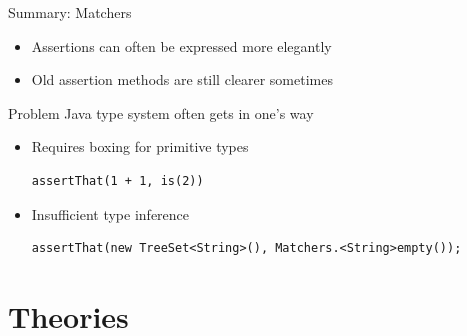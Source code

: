 \begin{frame}[fragile]{Summary: Matchers}
	\begin{itemize}
		\item Assertions can often be expressed more elegantly
		\item Old assertion methods are still clearer sometimes
	\end{itemize}
	\begin{block}{Problem}
		Java type system often gets in one's way
		\begin{itemize}
			\item Requires boxing for primitive types \begin{lstlisting}
assertThat(1 + 1, is(2))
\end{lstlisting}
			\item Insufficient type inference \begin{lstlisting}
assertThat(new TreeSet<String>(), Matchers.<String>empty());
\end{lstlisting}
		\end{itemize}
	\end{block}
\end{frame}

{
\date{Wassily Kandinsky, Composition VIII}
\part{Theories}
}


